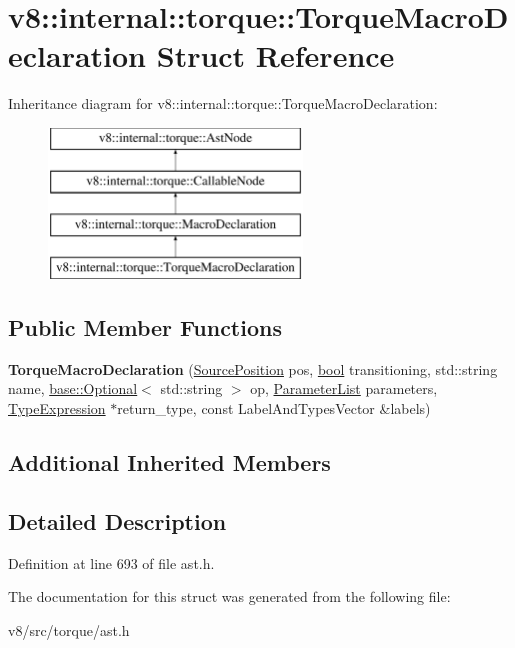 \hypertarget{structv8_1_1internal_1_1torque_1_1TorqueMacroDeclaration}{}\section{v8\+:\+:internal\+:\+:torque\+:\+:Torque\+Macro\+Declaration Struct Reference}
\label{structv8_1_1internal_1_1torque_1_1TorqueMacroDeclaration}
Inheritance diagram for v8\+:\+:internal\+:\+:torque\+:\+:Torque\+Macro\+Declaration\+:\begin{figure}[H]
\begin{center}
\leavevmode
\includegraphics[height=4.000000cm]{structv8_1_1internal_1_1torque_1_1TorqueMacroDeclaration}
\end{center}
\end{figure}
\subsection*{Public Member Functions}
\begin{DoxyCompactItemize}
\item 
\mbox{\label{structv8_1_1internal_1_1torque_1_1TorqueMacroDeclaration_a63bfd528aa3fcea215cea697a08fe01b}} 
{\bfseries Torque\+Macro\+Declaration} (\mbox{\hyperlink{structv8_1_1internal_1_1torque_1_1SourcePosition}{Source\+Position}} pos, \mbox{\hyperlink{classbool}{bool}} transitioning, std\+::string name, \mbox{\hyperlink{classv8_1_1base_1_1Optional}{base\+::\+Optional}}$<$ std\+::string $>$ op, \mbox{\hyperlink{structv8_1_1internal_1_1torque_1_1ParameterList}{Parameter\+List}} parameters, \mbox{\hyperlink{structv8_1_1internal_1_1torque_1_1TypeExpression}{Type\+Expression}} $\ast$return\+\_\+type, const Label\+And\+Types\+Vector \&labels)
\end{DoxyCompactItemize}
\subsection*{Additional Inherited Members}


\subsection{Detailed Description}


Definition at line 693 of file ast.\+h.



The documentation for this struct was generated from the following file\+:\begin{DoxyCompactItemize}
\item 
v8/src/torque/ast.\+h\end{DoxyCompactItemize}
